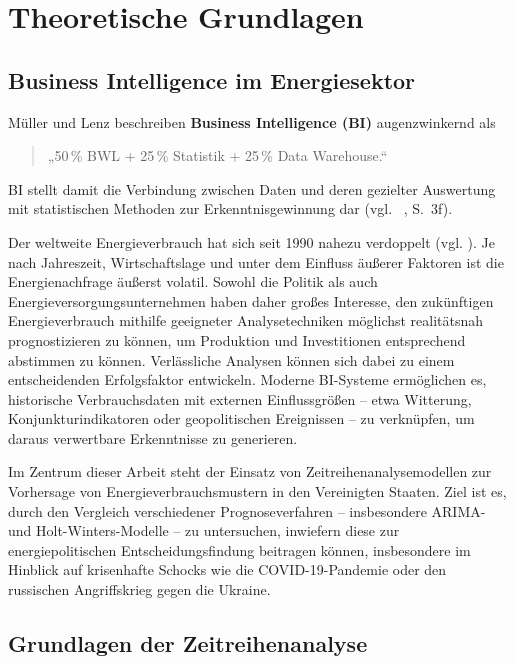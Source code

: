 \newpage

\section{Theoretische Grundlagen}
\label{sec:theorie}

\subsection{Business Intelligence im Energiesektor}
\label{subsec:bi-energie}

Müller und Lenz beschreiben \textbf{Business Intelligence (BI)} augenzwinkernd als
\begin{quote}
    „50\,\% BWL + 25\,\% Statistik + 25\,\% Data Warehouse.“
\end{quote}
BI stellt damit die Verbindung zwischen Daten und deren gezielter Auswertung mit statistischen Methoden zur Erkenntnisgewinnung dar (vgl.\ \citeauthor{mueller2013} \citeyear{mueller2013}, S.~3f).

Der weltweite Energieverbrauch hat sich seit 1990 nahezu verdoppelt (vgl. \citeauthor{enerdata2025} \citeyear{enerdata2025}). Je nach Jahreszeit, Wirtschaftslage und unter dem Einfluss äußerer Faktoren ist die Energienachfrage äußerst volatil. Sowohl die Politik als auch Energieversorgungsunternehmen haben daher großes Interesse, den zukünftigen Energieverbrauch mithilfe geeigneter Analysetechniken möglichst realitätsnah prognostizieren zu können, um Produktion und Investitionen entsprechend abstimmen zu können. Verlässliche Analysen können sich dabei zu einem entscheidenden Erfolgsfaktor entwickeln. Moderne BI-Systeme ermöglichen es, historische Verbrauchsdaten mit externen Einflussgrößen – etwa Witterung, Konjunkturindikatoren oder geopolitischen Ereignissen – zu verknüpfen, um daraus verwertbare Erkenntnisse zu generieren.

Im Zentrum dieser Arbeit steht der Einsatz von Zeitreihenanalysemodellen zur Vorhersage von Energieverbrauchsmustern in den Vereinigten Staaten. Ziel ist es, durch den Vergleich verschiedener Prognoseverfahren – insbesondere ARIMA- und Holt-Winters-Modelle – zu untersuchen, inwiefern diese zur energiepolitischen Entscheidungsfindung beitragen können, insbesondere im Hinblick auf krisenhafte Schocks wie die COVID-19-Pandemie oder den russischen Angriffskrieg gegen die Ukraine.


\subsection{Grundlagen der Zeitreihenanalyse}
\label{subsec:ts-grundlagen}

